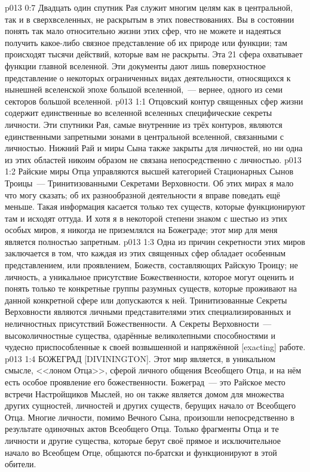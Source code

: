\vs p013 0:7 Двадцать один спутник Рая служит многим целям как в центральной, так и в сверхвселенных, не раскрытым в этих повествованиях. Вы в состоянии понять так мало относительно жизни этих сфер, что не можете и надеяться получить какое\hyp{}либо связное представление об их природе или функции; там происходят тысячи действий, которые вам не раскрыты. Эта 21 сфера охватывает  функции главной вселенной. Эти документы дают лишь поверхностное представление о некоторых ограниченных видах деятельности, относящихся к нынешней вселенской эпохе большой вселенной,~--- вернее, одного из семи секторов большой вселенной.
\vs p013 1:1 Отцовский контур священных сфер жизни содержит единственные во вселенной вселенных специфические секреты личности. Эти спутники Рая, самые внутренние из трёх контуров, являются единственными запретными зонами в центральной вселенной, связанными с личностью. Нижний Рай и миры Сына также закрыты для личностей, но ни одна из этих областей никоим образом не связана непосредственно с личностью.
\vs p013 1:2 Райские миры Отца управляются высшей категорией Стационарных Сынов Троицы~--- Тринитизованными Секретами Верховности. Об этих мирах я мало что могу сказать; об их разнообразной деятельности я вправе поведать ещё меньше. Такая информация касается только тех существ, которые функционируют там и исходят оттуда. И хотя я в некоторой степени знаком с шестью из этих особых миров, я никогда не приземлялся на Божеграде; этот мир для меня является полностью запретным.
\vs p013 1:3 Одна из причин секретности этих миров заключается в том, что каждая из этих священных сфер обладает особенным представлением, или проявлением, Божеств, составляющих Райскую Троицу; не личность, а уникальное присутствие Божественности, которое могут оценить и понять только те конкретные группы разумных существ, которые проживают на данной конкретной сфере или допускаются к ней. Тринитизованные Секреты Верховности являются личными представителями этих специализированных и неличностных присутствий Божественности. А Секреты Верховности~--- высоколичностные существа, одарённые великолепными способностями и чудесно приспособленные к своей возвышенной и напряжённой [exacting] работе.
\vs p013 1:4 БОЖЕГРАД [DIVININGTON]. Этот мир является, в уникальном смысле, <<лоном Отца>>, сферой личного общения Всеобщего Отца, и на нём есть особое проявление его божественности. Божеград~--- это Райское место встречи Настройщиков Мыслей, но он также является домом для множества других сущностей, личностей и других существ, берущих начало от Всеобщего Отца. Многие личности, помимо Вечного Сына, произошли непосредственно в результате одиночных актов Всеобщего Отца. Только фрагменты Отца и те личности и другие существа, которые берут своё прямое и исключительное начало во Всеобщем Отце, общаются по\hyp{}братски и функционируют в этой обители.

